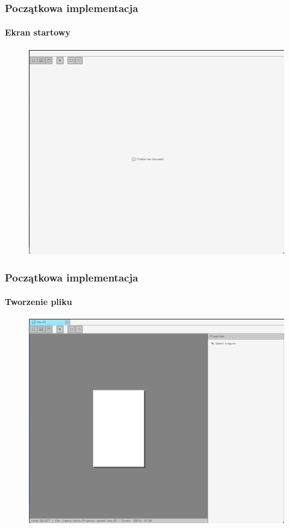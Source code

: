 \documentclass[
	11pt,]{beamer}
\begin{document}
\begin{frame}
	\frametitle{Początkowa implementacja}
	\framesubtitle{Ekran startowy}
	
	\begin{figure}
		\includegraphics[height=0.7\textheight]{figures/pro1.png}
	\end{figure}
\end{frame}

\begin{frame}
	\frametitle{Początkowa implementacja}
	\framesubtitle{Tworzenie pliku}
	
	\begin{figure}
		\includegraphics[height=0.7\textheight]{figures/pro2.png}
	\end{figure}
\end{frame}
\end{document}
